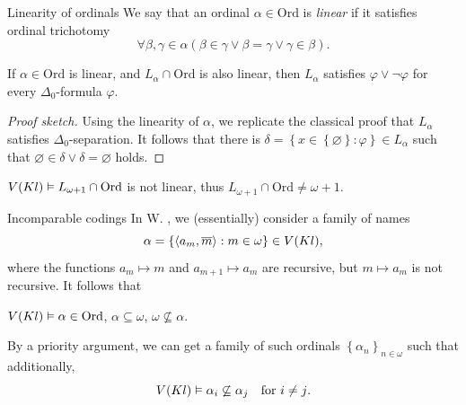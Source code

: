 \documentclass{beamer}
\newcommand\tuple[1]{\left\langle #1 \right\rangle}
\begin{document}
\begin{frame}{Linearity of ordinals}
  We say that an ordinal $\alpha \in \mathrm{Ord}$ is \emph{linear} if it satisfies ordinal trichotomy
  \[\forall \beta, \gamma \in \alpha \left(\beta \in \gamma \lor \beta = \gamma \lor \gamma \in \beta\right).\]

  \begin{theorem}
    If $\alpha \in \mathrm{Ord}$ is linear, and $L_\alpha \cap \mathrm{Ord}$ is also linear, then $L_\alpha$ satisfies $\varphi \lor \neg \varphi$ for every $\Delta_0$-formula $\varphi$.
  \end{theorem}

  \begin{proof}[Proof sketch]
    Using the linearity of $\alpha$, we replicate the classical proof that $L_\alpha$ satisfies $\Delta_0$-separation. It follows that there is $\delta = \left\{x \in \left\{\varnothing\right\} : \varphi\right\} \in L_\alpha$ such that $\varnothing \in \delta \lor \delta = \varnothing$ holds.
  \end{proof}

  \pause

  \begin{corollary}
    $V\mleft(Kl\mright) \vDash L_{\omega + 1} \cap \mathrm{Ord}$ is not linear, thus $L_{\omega + 1} \cap \mathrm{Ord} \neq \omega + 1$.
  \end{corollary}
\end{frame}

\begin{frame}{Incomparable codings}
  In W. , we (essentially) consider a family of names
  \[\alpha = \left\{\tuple{a_m, \overline{m}} : m \in \omega\right\} \in V\mleft(Kl\mright),\]
  where the functions $a_m \mapsto m$ and $a_{m + 1} \mapsto a_m$ are recursive, but $m \mapsto a_m$ is not recursive. It follows that
  \begin{lemma}
    $V\mleft(Kl\mright) \vDash \alpha \in \mathrm{Ord}$, $\alpha \subseteq \omega$, $\omega \not\subseteq \alpha$.
  \end{lemma}

  \vspace{1em}

  By a priority argument, we can get a family of such ordinals $\left\{\alpha_n\right\}_{n \in \omega}$ such that additionally,
  \[V\mleft(Kl\mright) \vDash \alpha_i \not\subseteq \alpha_j \quad \text{for $i \neq j$}.\]
\end{frame}
\end{document}
